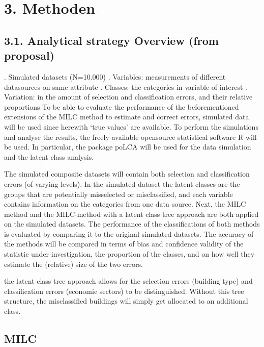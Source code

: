 \documentclass[
]{article}
\begin{document}
\hypertarget{methoden}{%
\section{3. Methoden}\label{methoden}}

\hypertarget{analytical-strategy-overview-from-proposal}{%
\subsection{3.1. Analytical strategy Overview (from
proposal)}\label{analytical-strategy-overview-from-proposal}}

. Simulated datasets (N=10.000) . Variables: measurements of different
datasources on same attribute . Classes: the categories in variable of
interest . Variation: in the amount of selection and classification
errors, and their relative proportions To be able to evaluate the
performance of the beforementioned extensions of the MILC method to
estimate and correct errors, simulated data will be used since herewith
`true values' are available. To perform the simulations and analyse the
results, the freely-available opensource statistical software R will be
used. In particular, the package poLCA will be used for the data
simulation and the latent class analysis.

The simulated composite datasets will contain both selection and
classification errors (of varying levels). In the simulated dataset the
latent classes are the groups that are potentially misselected or
misclassified, and each variable contains information on the categories
from one data source. Next, the MILC method and the MILC-method with a
latent class tree approach are both applied on the simulated datasets.
The performance of the classifications of both methods is evaluated by
comparing it to the original simulated datasets. The accuracy of the
methods will be compared in terms of bias and confidence validity of the
statistic under investigation, the proportion of the classes, and on how
well they estimate the (relative) size of the two errors.

the latent class tree approach allows for the selection errors (building
type) and classification errors (economic sectors) to be distinguished.
Without this tree structure, the misclassified buildings will simply get
allocated to an additional class.

\hypertarget{milc}{%
\subsection{MILC}\label{milc}}
\end{document}
